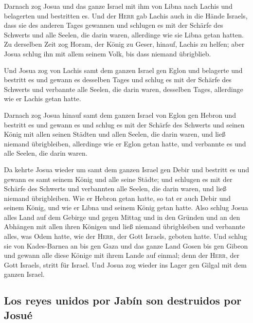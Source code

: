  Darnach zog Josua und das ganze Israel mit ihm von Libna
nach Lachis und belagerten und bestritten es.  Und der
\textsc{Herr} gab Lachis auch in die Hände Israels, dass sie des anderen
Tages gewannen und schlugen es mit der Schärfe des Schwerts und alle
Seelen, die darin waren, allerdinge wie sie Libna getan hatten.
 Zu derselben Zeit zog Horam, der König zu Geser, hinauf,
Lachis zu helfen; aber Josua schlug ihn mit allem seinem Volk, bis dass
niemand übrigblieb.

 Und Josua zog von Lachis samt dem ganzen Israel gen
Eglon und belagerte und bestritt es  und gewann es
desselben Tages und schlug es mit der Schärfe des Schwerts und verbannte
alle Seelen, die darin waren, desselben Tages, allerdinge wie er Lachis
getan hatte.

 Darnach zog Josua hinauf samt dem ganzen Israel von
Eglon gen Hebron und bestritt es  und gewann es und
schlug es mit der Schärfe des Schwerts und seinen König mit allen seinen
Städten und allen Seelen, die darin waren, und ließ niemand
übrigbleiben, allerdinge wie er Eglon getan hatte, und verbannte es und
alle Seelen, die darin waren.

 Da kehrte Josua wieder um samt dem ganzen Israel gen
Debir und bestritt es  und gewann es samt seinem König
und alle seine Städte; und schlugen es mit der Schärfe des Schwerts und
verbannten alle Seelen, die darin waren, und ließ niemand übrigbleiben.
Wie er Hebron getan hatte, so tat er auch Debir und seinem König, und
wie er Libna und seinem König getan hatte.  Also schlug
Josua alles Land auf dem Gebirge und gegen Mittag und in den Gründen und
an den Abhängen mit allen ihren Königen und ließ niemand übrigbleiben
und verbannte alles, was Odem hatte, wie der \textsc{Herr}, der Gott
Israels, geboten hatte.  Und schlug sie von Kades-Barnea
an bis gen Gaza und das ganze Land Gosen bis gen Gibeon 
und gewann alle diese Könige mit ihrem Lande auf einmal; denn der
\textsc{Herr}, der Gott Israels, stritt für Israel.  Und
Josua zog wieder ins Lager gen Gilgal mit dem ganzen Israel.

\hypertarget{los-reyes-unidos-por-jabuxedn-son-destruidos-por-josuuxe9}{%
\subsection{Los reyes unidos por Jabín son destruidos por
Josué}\label{los-reyes-unidos-por-jabuxedn-son-destruidos-por-josuuxe9}}

